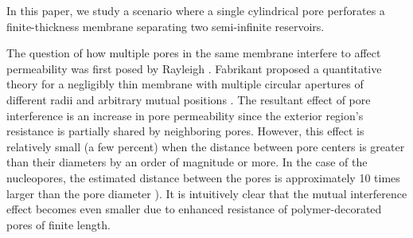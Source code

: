 \documentclass[12pt, a4paper]{article}
\begin{document}



In this paper, we study a scenario where a single cylindrical pore perforates a finite-thickness membrane separating two semi-infinite reservoirs.

The question of how multiple pores in the same membrane interfere to affect permeability was first posed by Rayleigh \cite{Strutt1878}.
Fabrikant proposed a quantitative theory for a negligibly thin membrane with multiple circular apertures of different radii and arbitrary mutual positions \cite{Fabrikant1985}.
The resultant effect of pore interference is an increase in pore permeability since the exterior region's resistance is partially shared by neighboring pores.
However, this effect is relatively small (a few percent) when the distance between pore centers is greater than their diameters by an order of magnitude or more. In the case of the nucleopores, the estimated distance between the pores is approximately 10 times larger than the pore diameter \cite{Yang2004, Daigle2001, Feldherr1984, Kubitscheck2000}). 
It is intuitively clear that the mutual interference effect becomes even smaller due to enhanced resistance of polymer-decorated pores of finite  length.

\end{document}
